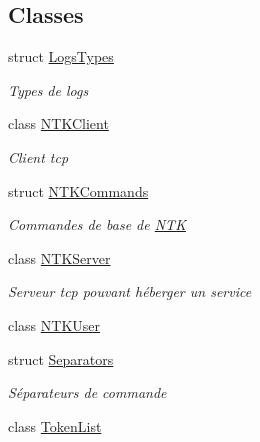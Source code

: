 \subsection*{Classes}
\begin{DoxyCompactItemize}
\item 
struct \mbox{\hyperlink{struct_n_t_k_1_1_logs_types}{Logs\+Types}}
\begin{DoxyCompactList}\small\item\em Types de logs \end{DoxyCompactList}\item 
class \mbox{\hyperlink{class_n_t_k_1_1_n_t_k_client}{N\+T\+K\+Client}}
\begin{DoxyCompactList}\small\item\em Client tcp \end{DoxyCompactList}\item 
struct \mbox{\hyperlink{struct_n_t_k_1_1_n_t_k_commands}{N\+T\+K\+Commands}}
\begin{DoxyCompactList}\small\item\em Commandes de base de \mbox{\hyperlink{namespace_n_t_k}{N\+TK}} \end{DoxyCompactList}\item 
class \mbox{\hyperlink{class_n_t_k_1_1_n_t_k_server}{N\+T\+K\+Server}}
\begin{DoxyCompactList}\small\item\em Serveur tcp pouvant héberger un service \end{DoxyCompactList}\item 
class \mbox{\hyperlink{class_n_t_k_1_1_n_t_k_user}{N\+T\+K\+User}}
\item 
struct \mbox{\hyperlink{struct_n_t_k_1_1_separators}{Separators}}
\begin{DoxyCompactList}\small\item\em Séparateurs de commande \end{DoxyCompactList}\item 
class \mbox{\hyperlink{class_n_t_k_1_1_token_list}{Token\+List}}
\end{DoxyCompactItemize}
